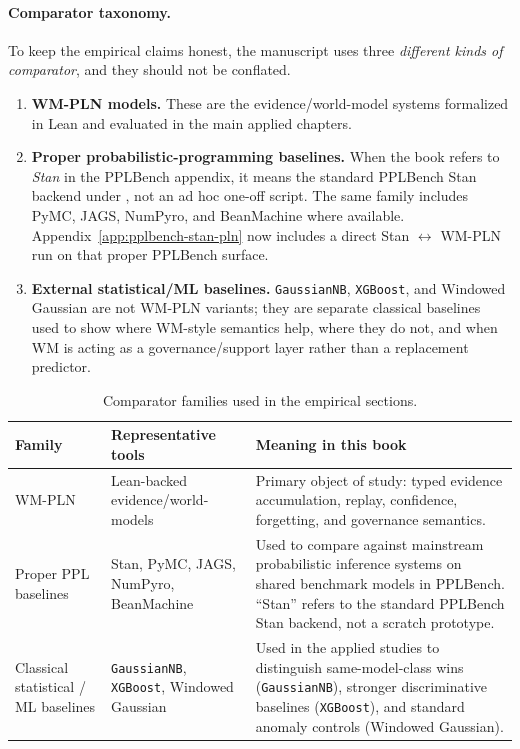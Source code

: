 \documentclass[11pt,openany]{report}
\begin{document}
\paragraph{Comparator taxonomy.}
To keep the empirical claims honest, the manuscript uses three
\emph{different kinds of comparator}, and they should not be conflated.
\begin{enumerate}
\item \textbf{WM-PLN models.} These are the evidence/world-model systems
formalized in Lean and evaluated in the main applied chapters.
\item \textbf{Proper probabilistic-programming baselines.} When the book
refers to \emph{Stan} in the PPLBench appendix, it means the standard
PPLBench Stan backend under , not an
ad hoc one-off script.  The same family includes PyMC, JAGS, NumPyro,
and BeanMachine where available.  Appendix~\ref{app:pplbench-stan-pln}
now includes a direct  Stan $\leftrightarrow$
WM-PLN run on that proper PPLBench surface.
\item \textbf{External statistical/ML baselines.} \texttt{GaussianNB},
\texttt{XGBoost}, and Windowed Gaussian are not WM-PLN variants; they are
separate classical baselines used to show where WM-style semantics help,
where they do not, and when WM is acting as a governance/support layer
rather than a replacement predictor.
\end{enumerate}

\begin{table}[htbp]
\centering
\footnotesize
\setlength{\tabcolsep}{4pt}
\renewcommand{\arraystretch}{0.96}
\caption{Comparator families used in the empirical sections.}
\label{tab:comparator-taxonomy}
\begin{tabular}{p{2.6cm}p{3.0cm}p{7.8cm}}
\toprule
Family & Representative tools & Meaning in this book \\
\midrule
WM-PLN &
Lean-backed evidence/world-models &
Primary object of study: typed evidence accumulation, replay, confidence,
forgetting, and governance semantics. \\
\addlinespace
Proper PPL baselines &
Stan, PyMC, JAGS, NumPyro, BeanMachine &
Used to compare against mainstream probabilistic inference systems on
shared benchmark models in PPLBench.  ``Stan'' refers to the standard
PPLBench Stan backend, not a scratch prototype. \\
\addlinespace
Classical statistical / ML baselines &
\texttt{GaussianNB}, \texttt{XGBoost}, Windowed Gaussian &
Used in the applied studies to distinguish same-model-class wins
(\texttt{GaussianNB}), stronger discriminative baselines
(\texttt{XGBoost}), and standard anomaly controls (Windowed Gaussian). \\
\bottomrule
\end{tabular}
\end{table}
\end{document}
